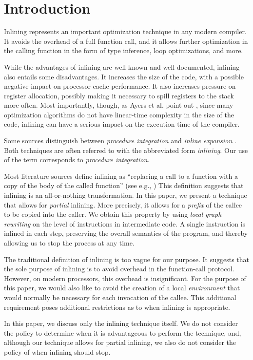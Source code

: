 \section{Introduction}

Inlining represents an important optimization technique in any modern
compiler.  It avoids the overhead of a full function call, and it
allows further optimization in the calling function in the form of
type inference, loop optimizations, and more.

While the advantages of inlining are well known and well documented,
inlining also entails some disadvantages.  It increases the size of
the code, with a possible negative impact on processor cache
performance.  It also increases pressure on register allocation,
possibly making it necessary to spill registers to the stack more
often.  Most importantly, though, as Ayers et al. point out
\cite{Ayers:1997:AI:258915.258928, Ayers:1997:AI:258916.258928}, since
many optimization algorithms do not have linear-time complexity in the
size of the code, inlining can have a serious impact on the execution
time of the compiler.

Some sources distinguish between \emph{procedure integration} and
\emph{inline expansion} \cite{Muchnick:1998:ACD:286076}.  Both
techniques are often referred to with the abbreviated form
\emph{inlining}.  Our use of the term corresponds to
\emph{procedure integration}.

Most literature sources define inlining as
``replacing a call to a function with a copy of the body of the called
function'' (see e.g.,
\cite{Chang:1989:IFE:74818.74840,Chang:1989:IFE:73141.74840,
  Scheifler:1977:AIS:359810.359830}) This definition suggests that
inlining is an all-or-nothing transformation.  In this paper, we
present a technique that allows for \emph{partial} inlining.  More
precisely, it allows for a \emph{prefix} of the callee to be copied
into the caller.  We obtain this property by using \emph{local graph
  rewriting} on the level of instructions in intermediate code.  A
single instruction is inlined in each step, preserving the overall
semantics of the program, and thereby allowing us to stop the process
at any time.

The traditional definition of inlining is too vague for our
purpose.  It suggests that the sole purpose of inlining is to avoid
overhead in the function-call protocol.  However, on modern
processors, this overhead is insignificant.  For the purpose of this
paper, we would also like to avoid the creation of a local
\emph{environment} that would normally be necessary for each
invocation of the callee.  This additional requirement poses
additional restrictions as to when inlining is appropriate.

In this paper, we discuss only the inlining technique itself.  We do
not consider the policy to determine when it is advantageous to
perform the technique, and, although our technique allows for partial
inlining, we also do not consider the policy of when inlining should
stop.

